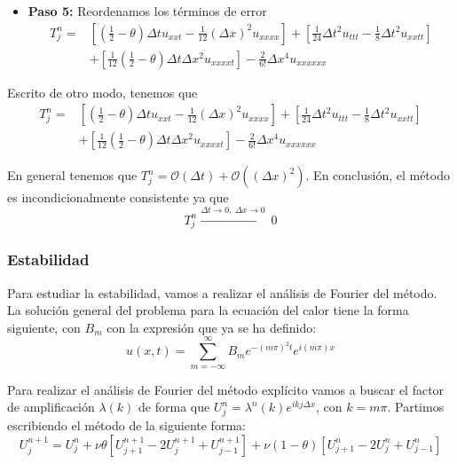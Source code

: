 \documentclass[spanish]{mathnotes}
\begin{document}
\begin{itemize}
			\item \textbf{Paso 5: }	Reordenamos los términos de error
			\begin{align*}
			T_j^n = & \left[\left(\frac{1}{2}-\theta\right)\Delta t u_{xxt}- \frac{1}{12}(\Delta x)^2 u_{xxxx}\right]
			+ \left[\frac{1}{24}\Delta t^2 u_{ttt}-\frac{1}{8}\Delta t ^2 u_{xxtt}\right]\\
			& + \left[\frac{1}{12}\left(\frac{1}{2}-\theta\right)\Delta t \Delta x^2 u_{xxxxt}\right] - \frac{2}{6!}\Delta x ^4 u_{xxxxxx}
			\end{align*}
			\end{itemize}
			
			Escrito de otro modo, tenemos que
			\begin{align*}
			T_j^n = & \left[\left(\frac{1}{2}-\theta\right)\Delta t u_{xxt}- \frac{1}{12}(\Delta x)^2 u_{xxxx}\right]
			+ \left[\frac{1}{24}\Delta t^2 u_{ttt}-\frac{1}{8}\Delta t ^2 u_{xxtt}\right]\\
			& + \left[\frac{1}{12}\left(\frac{1}{2}-\theta\right)\Delta t \Delta x^2 u_{xxxxt}\right] - \frac{2}{6!}\Delta x ^4 u_{xxxxxx}
			\end{align*}
			
			En general tenemos que $T_j^n = \mathcal{O}(\Delta t) + \mathcal{O}\left((\Delta x)^2\right)$. En conclusión, el método es incondicionalmente consistente ya que 
			$$T_j^n  \scriptstyle{\xrightarrow{\Delta t\to0,\ \Delta x \to 0}} \textstyle\ 0$$
			
			\subsubsection{Estabilidad}
			Para estudiar la estabilidad, vamos a realizar el análisis de Fourier del método. La solución general del problema para la ecuación del calor tiene la forma siguiente, con $B_m$ con la expresión que ya se ha definido:
			$$u(x,t) = \sum_{m=-\infty}^\infty B_m e^{-(m\pi)^2 t}e^{i(m\pi)x}$$
			
			Para realizar el análisis de Fourier del método explícito vamos a buscar el factor de amplificación $\lambda(k)$ de forma que $U_j^n = \lambda^n(k)e^{ikj\Delta x}$, con $k=m\pi$. Partimos escribiendo el método de la siguiente forma:
			$$U_j^{n+1} = U_j^n + \nu\theta\left[U_{j+1}^{n+1} - 2U_{j}^{n+1} + U_{j-1}^{n+1}\right] + \nu(1-\theta)\left[U_{j+1}^{n}-2U_{j}^{n}+U_{j-1}^{n}\right]$$
			
\end{document}

